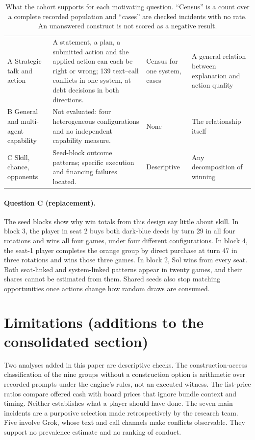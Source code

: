 \begin{table}[htbp]
\begin{tabularx}{\linewidth}{@{}L{2.5cm}YL{1.6cm}Y@{}}
\midrule
A Strategic talk and action & A statement, a plan, a submitted action and the applied action can each be right or wrong; 139 text--call conflicts in one system, at debt decisions in both directions. & Census for one system, cases & A general relation between explanation and action quality\\
B General and multi-agent capability & Not evaluated: four heterogeneous configurations and no independent capability measure. & None & The relationship itself\\
C Skill, chance, opponents & Seed-block outcome patterns; specific execution and financing failures located. & Descriptive & Any decomposition of winning\\
\bottomrule
\end{tabularx}
\caption{What the cohort supports for each motivating question. ``Census'' is a count over a complete recorded population and ``cases'' are checked incidents with no rate. An unanswered construct is not scored as a negative result.}
\end{table}

\paragraph{Question C (replacement).} The seed blocks show why win totals from this design say little about skill. In block 3, the player in seat 2 buys both dark-blue deeds by turn 29 in all four rotations and wins all four games, under four different configurations. In block 4, the seat-1 player completes the orange group by direct purchase at turn 47 in three rotations and wins those three games. In block 2, Sol wins from every seat. Both seat-linked and system-linked patterns appear in twenty games, and their shares cannot be estimated from them. Shared seeds also stop matching opportunities once actions change how random draws are consumed.

\section{Limitations (additions to the consolidated section)}

Two analyses added in this paper are descriptive checks. The construction-access classification of the nine groups without a construction option is arithmetic over recorded prompts under the engine's rules, not an executed witness. The list-price ratios compare offered cash with board prices that ignore bundle context and timing. Neither establishes what a player should have done. The seven main incidents are a purposive selection made retrospectively by the research team. Five involve Grok, whose text and call channels make conflicts observable. They support no prevalence estimate and no ranking of conduct.

